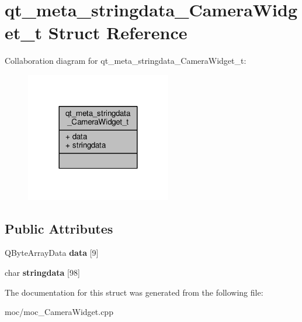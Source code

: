 \hypertarget{structqt__meta__stringdata___camera_widget__t}{\section{qt\-\_\-meta\-\_\-stringdata\-\_\-\-Camera\-Widget\-\_\-t Struct Reference}
\label{structqt__meta__stringdata___camera_widget__t}
}


Collaboration diagram for qt\-\_\-meta\-\_\-stringdata\-\_\-\-Camera\-Widget\-\_\-t\-:
\nopagebreak
\begin{figure}[H]
\begin{center}
\leavevmode
\includegraphics[width=180pt]{structqt__meta__stringdata___camera_widget__t__coll__graph}
\end{center}
\end{figure}
\subsection*{Public Attributes}
\begin{DoxyCompactItemize}
\item 
\hypertarget{structqt__meta__stringdata___camera_widget__t_a3c74324d4597ed9b55d097806da03b0e}{Q\-Byte\-Array\-Data {\bfseries data} \mbox{[}9\mbox{]}}\label{structqt__meta__stringdata___camera_widget__t_a3c74324d4597ed9b55d097806da03b0e}

\item 
\hypertarget{structqt__meta__stringdata___camera_widget__t_a02d644273d1d611abe9ad57a4fa09542}{char {\bfseries stringdata} \mbox{[}98\mbox{]}}\label{structqt__meta__stringdata___camera_widget__t_a02d644273d1d611abe9ad57a4fa09542}

\end{DoxyCompactItemize}


The documentation for this struct was generated from the following file\-:\begin{DoxyCompactItemize}
\item 
moc/moc\-\_\-\-Camera\-Widget.\-cpp\end{DoxyCompactItemize}
